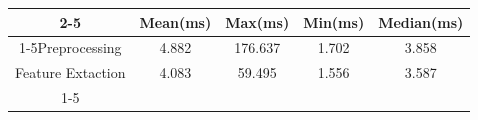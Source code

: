 \documentclass{standalone}
\begin{document}
 
 \begin{tabular}{|c |c |c |c |c |}
\cline{2-5}\cline{2-5} \multicolumn{1}{c |}{ } & Mean(ms) & Max(ms) & Min(ms) & Median(ms)\\ 
\cline{1-5}Preprocessing & 4.882 & 176.637 & 1.702 & 3.858\\ 
 \hhline{|=|=|=|=|=|}Feature Extaction & 4.083 & 59.495 & 1.556 & 3.587\\ 
 \cline{1-5}\hline \end{tabular}
 
\end{document}
